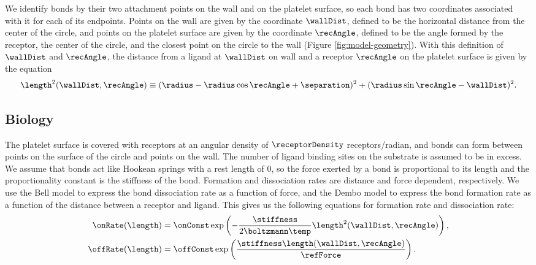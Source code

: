 We identify bonds by their two attachment points on the wall and on
the platelet surface, so each bond has two coordinates associated with
it for each of its endpoints. Points on the wall are given by the
coordinate $\wallDist$, defined to be the horizontal distance from the
center of the circle, and points on the platelet surface are given by
the coordinate $\recAngle$, defined to be the angle formed by the
receptor, the center of the circle, and the closest point on the
circle to the wall (Figure \ref{fig:model-geometry}). With this
definition of $\wallDist$ and $\recAngle$, the distance from a ligand at
$\wallDist$ on wall and a receptor $\recAngle$ on the platelet surface is
given by the equation
\begin{equation}
  \label{eq:dim-length}
  \length^2 (\wallDist, \recAngle) \equiv (\radius - \radius\cos\recAngle +
  \separation)^2 + (\radius\sin\recAngle - \wallDist)^2.
\end{equation}

\subsection{Biology}
\label{sec:biology}

The platelet surface is covered with receptors at an angular density
of $\receptorDensity$ receptors/radian, and bonds can form between
points on the surface of the circle and points on the wall. The number
of ligand binding sites on the substrate is assumed to be in
excess. We assume that bonds act like Hookean springs with a rest
length of 0, so the force exerted by a bond is proportional to its
length and the proportionality constant is the stiffness of the
bond. Formation and dissociation rates are distance and force
dependent, respectively. We use the Bell model \cite{Bell1978} to
express the bond dissociation rate as a function of force, and the
Dembo model \cite{Dembo1988} to express the bond formation rate as a
function of the distance between a receptor and ligand. This gives us
the following equations for formation rate and dissociation rate:
\begin{align}
  \label{eq:binding}
  \onRate(\length) &= \onConst \exp
                     \left(-\frac{\stiffness}{2\boltzmann\temp}
                     \length^2(\wallDist, \recAngle) \right), \\
  \label{eq:unbinding}
  \offRate(\length) &= \offConst \exp \left( \frac{\stiffness
                      \length(\wallDist, \recAngle)}{\refForce} \right).
\end{align}

